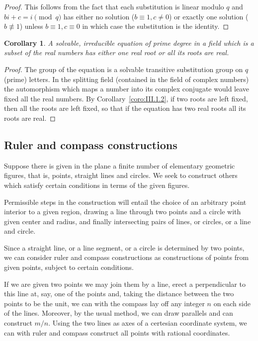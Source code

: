 \documentclass[10pt,leqno]{article}
\newtheorem{coro}{Corollary}
\theoremstyle{definition}
\begin{document}
\begin{proof}
This follows from the fact that each substitution is linear modulo $q$ and $bi + c = i \pmod q$ has either no solution ($b \equiv 1, c\not= 0$) or exactly one solution ($b \not\equiv 1$) unless $b \equiv 1, c \equiv 0$ in which case the substitution is the identity.
\end{proof}


\begin{coro}
\label{coro:III.2.2}
A solvable, irreducible equation of prime degree in a field which is a subset of the real numbers has either one real root or all its roots are real.
\end{coro}

\begin{proof}
The group of the equation is a solvable transitive substitution group on $q$ (prime) letters.
In the splitting field (contained in the field of complex numbers) the automorphism which maps a number into its complex conjugate would leave fixed all the real numbers.
By Corollary~\ref{coro:III.1.2}, if two roots are left fixed, then all the roots are left fixed, so that if the equation has two real roots all its roots are real.
\end{proof}


\subsection{Ruler and compass constructions}


Suppose there is given in the plane a finite number of elementary geometric figures, that is, points, straight lines and circles.
We seek to construct others which satisfy certain conditions in terms of the given figures.

Permissible steps in the construction will entail the choice of an arbitrary point interior to a given region, drawing a line through two points and a circle with given center and radius, and finally intersecting pairs of lines, or circles, or a line and circle.

Since a straight line, or a line segment, or a circle is determined by two points, we can consider ruler and compass constructions as constructions of points from given points, subject to certain conditions.

If we are given two points we may join them by a line, erect a perpendicular to this line at, say, one of the points and, taking the distance between the two points to be the unit, we can with the compass lay off any integer $n$ on each side of the lines.
Moreover, by the usual method, we can draw parallels and can construct $m/n$.
Using the two lines as axes of a certesian coordinate system, we can with ruler and compass construct all points with rational coordinates.
\end{document}
